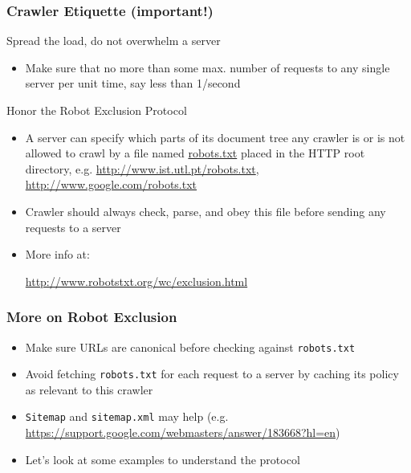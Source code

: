 \documentclass{beamer}
\begin{document}
\begin{frame} \frametitle{Crawler Etiquette (important!)}

\begin{block}{Spread the load, do not overwhelm a server}
\begin{itemize}
\item Make sure that no more than some max. number of requests to any single
server per unit time, say less than 1/second
\end{itemize}
\end{block}

\begin{block}{Honor the Robot Exclusion Protocol}
\begin{itemize}

\item A server can specify which parts of its document tree any crawler is or is not allowed to crawl by a file named \url{robots.txt} placed in the HTTP root directory, e.g. \url{http://www.ist.utl.pt/robots.txt}, \url{http://www.google.com/robots.txt}

\item Crawler should always check, parse, and obey this file before sending any requests to a server

\item More info at:

\url{http://www.robotstxt.org/wc/exclusion.html}

\end{itemize}

\end{block}

\end{frame}


\begin{frame} \frametitle{More on Robot Exclusion}

\begin{itemize}
\item Make sure URLs are canonical before checking against {\tt robots.txt} 

\item Avoid fetching {\tt robots.txt} for each request to a server by
  caching its policy as relevant to this crawler

\item {\tt Sitemap} and {\tt sitemap.xml} may help (e.g. \url{https://support.google.com/webmasters/answer/183668?hl=en})

\item Let's look at some examples to understand the protocol

\end{itemize}
\end{frame}
\end{document}
